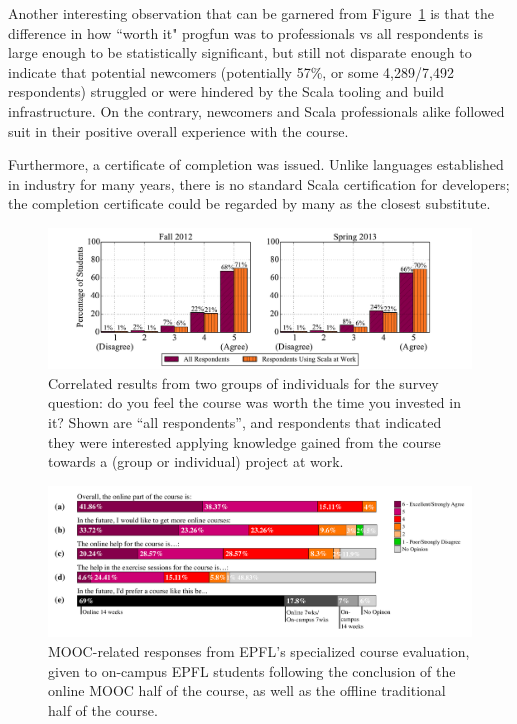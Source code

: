 \documentclass{sig-alternate}
\begin{document}
Another interesting observation that can be garnered from Figure~\ref{fig:worth-it-apply-it}
is that the difference in how ``worth it" progfun was to professionals vs all respondents
is large enough to be statistically significant, but still not disparate enough to indicate
that potential newcomers (potentially 57\%, or some 4,289/7,492 respondents) struggled or were
hindered by the Scala tooling and build infrastructure. On the contrary, newcomers and
Scala professionals alike followed suit in their positive overall experience with the course.


Furthermore, a certificate of completion was issued. Unlike languages
established in industry for many years, there is no standard Scala
certification for developers; the completion certificate could be regarded by
many as the closest substitute.


\begin{figure}[ht!]
  \centering
  \includegraphics[width=\textwidth]{plots/worth-it-apply-it.pdf}
  \caption{Correlated results from two groups of individuals for the survey question: do you feel the course was worth the time you invested in it? Shown are ``all respondents'', and respondents that indicated they were interested applying knowledge gained from the course towards a (group or individual) project at work.}
  \label{fig:worth-it-apply-it}
\end{figure}

\begin{figure}[ht!]
  \centering
  \includegraphics[width=\textwidth]{plots/epfl-course-eval.pdf}
  \caption{MOOC-related responses from EPFL's specialized course evaluation, given to on-campus EPFL students following the conclusion of the online MOOC half of the course, as well as the offline traditional half of the course.}
  \label{fig:epfl-course-eval}
\end{figure}
\end{document}
